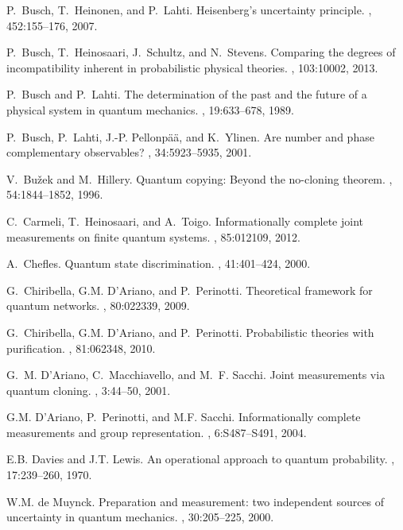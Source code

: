 \documentclass[12pt]{article}
\theoremstyle{definition}
\begin{document}
{\begin{thebibliography}{10}
P.~Busch, T.~Heinonen, and P.~Lahti.
\newblock Heisenberg's uncertainty principle.
, 452:155--176, 2007.

P.~Busch, T.~Heinosaari, J.~Schultz, and N.~Stevens.
\newblock Comparing the degrees of incompatibility inherent in probabilistic
  physical theories.
, 103:10002, 2013.

P.~Busch and P.~Lahti.
\newblock The determination of the past and the future of a physical system in
  quantum mechanics.
, 19:633--678, 1989.

P.~Busch, P.~Lahti, J.-P. Pellonp{\"a}{\"a}, and K.~Ylinen.
\newblock Are number and phase complementary observables?
, 34:5923--5935, 2001.

V.~Bu\v{z}ek and M.~Hillery.
\newblock Quantum copying: {B}eyond the no-cloning theorem.
, 54:1844--1852, 1996.

C.~Carmeli, T.~Heinosaari, and A.~Toigo.
\newblock Informationally complete joint measurements on finite quantum
  systems.
, 85:012109, 2012.

A.~Chefles.
\newblock Quantum state discrimination.
, 41:401--424, 2000.

G.~Chiribella, G.M. D'Ariano, and P.~Perinotti.
\newblock Theoretical framework for quantum networks.
, 80:022339, 2009.

G.~Chiribella, G.M. D'Ariano, and P.~Perinotti.
\newblock Probabilistic theories with purification.
, 81:062348, 2010.

G.~M. D'Ariano, C.~Macchiavello, and M.~F. Sacchi.
\newblock Joint measurements via quantum cloning.
, 3:44--50, 2001.

G.M. D'Ariano, P.~Perinotti, and M.F. Sacchi.
\newblock Informationally complete measurements and group representation.
, 6:S487--S491, 2004.

E.B. Davies and J.T. Lewis.
\newblock An operational approach to quantum probability.
, 17:239--260, 1970.

W.M. {de Muynck}.
\newblock Preparation and measurement: two independent sources of uncertainty
  in quantum mechanics.
, 30:205--225, 2000.


\end{thebibliography}}
\end{document}
